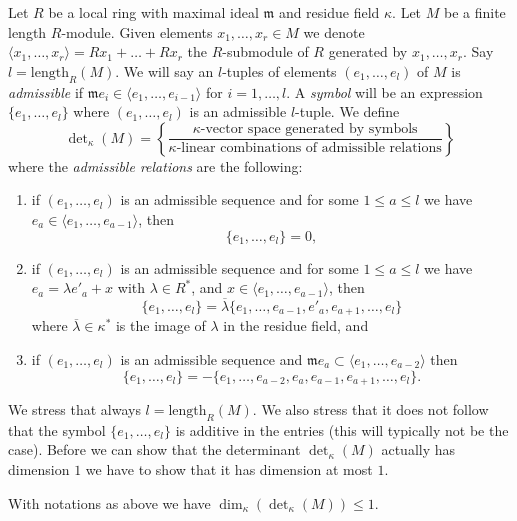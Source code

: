 \medskip\noindent
Let $R$ be a local ring with maximal ideal $\mathfrak m$ and
residue field $\kappa$. Let $M$ be a finite length $R$-module.
Given elements $x_1, \ldots, x_r \in M$ we denote
$\langle x_1, \ldots, x_r \rangle = Rx_1 + \ldots + Rx_r$ the
$R$-submodule of $R$ generated by $x_1, \ldots, x_r$.
Say $l = \text{length}_R(M)$.
We will say an $l$-tuples of elements
$(e_1, \ldots, e_l)$ of $M$ is {\it admissible} if
$\mathfrak m e_i \in \langle e_1, \ldots, e_{i - 1} \rangle$
for $i = 1, \ldots, l$.
A {\it symbol} will be an expression $\{e_1, \ldots, e_l\}$ where
$(e_1, \ldots, e_l)$ is an admissible $l$-tuple.
We define
\begin{equation}
\label{equation-definition-det-kappa}
\det\nolimits_\kappa(M) =
\left\{
\frac{\kappa\text{-vector space generated by symbols}}
{\kappa\text{-linear combinations of admissible relations}}
\right\}
\end{equation}
where the {\it admissible relations} are the following:
\begin{enumerate}
\item if $(e_1, \ldots, e_l)$ is an admissible sequence and
for some $1 \leq a \leq l$ we have
$e_a \in \langle e_1, \ldots, e_{a - 1}\rangle$, then
$$
\{e_1, \ldots, e_l\} = 0,
$$
\item if $(e_1, \ldots, e_l)$ is an admissible sequence and
for some $1 \leq a \leq l$ we have $e_a = \lambda e'_a + x$
with $\lambda \in R^*$, and
$x \in \langle e_1, \ldots, e_{a - 1}\rangle$, then
$$
\{e_1, \ldots, e_l\} =
\overline{\lambda} \{e_1, \ldots, e_{a - 1}, e'_a, e_{a + 1}, \ldots, e_l\}
$$
where $\overline{\lambda} \in \kappa^*$ is the image of $\lambda$ in
the residue field, and
\item if $(e_1, \ldots, e_l)$ is an admissible sequence and
$\mathfrak m e_a \subset \langle e_1, \ldots, e_{a - 2}\rangle$ then
$$
\{e_1, \ldots, e_l\} =
- \{e_1, \ldots, e_{a - 2}, e_a, e_{a - 1}, e_{a + 1}, \ldots, e_l\}.
$$
\end{enumerate}
We stress that always $l = \text{length}_R(M)$. We also stress that
it does not follow that the symbol $\{e_1, \ldots, e_l\}$ is
additive in the entries (this will typically not be the case).
Before we can show that the determinant $\det_\kappa(M)$ actually
has dimension $1$ we have to show that it has dimension at most $1$.

\begin{lemma}
\label{lemma-dimension-at-most-one}
With notations as above we have $\dim_\kappa(\det_\kappa(M)) \leq 1$.
\end{lemma}


